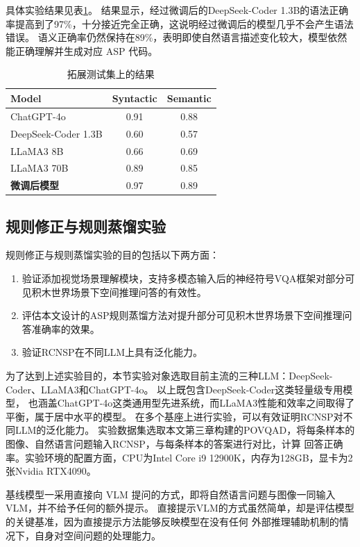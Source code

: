 具体实验结果见表\ref{tab:robust1}。
结果显示，经过微调后的DeepSeek-Coder 1.3B的语法正确率提高到了97\%，十分接近完全正确，这说明经过微调后的模型几乎不会产生语法错误。
语义正确率仍然保持在89\%，表明即使自然语言描述变化较大，模型依然能正确理解并生成对应 ASP 代码。

\begin{table}[h]
\centering
\begin{tabular}{lcc}
\toprule
\textbf{Model} & \textbf{Syntactic} & \textbf{Semantic} \\
\midrule
ChatGPT-4o     & 0.91   & 0.88 \\
DeepSeek-Coder 1.3B         & 0.60     & 0.57 \\
LLaMA3 8B      & 0.66     & 0.69 \\
LLaMA3 70B    & 0.89     & 0.85 \\
\midrule
\textbf{微调后模型}  & 0.97 & 0.89 \\
\bottomrule
\end{tabular}
\caption{拓展测试集上的结果}
\label{tab:robust1}
\end{table}
\subsection{规则修正与规则蒸馏实验}
规则修正与规则蒸馏实验的目的包括以下两方面：
\begin{enumerate}[nosep]
\item 验证添加视觉场景理解模块，支持多模态输入后的神经符号VQA框架对部分可见积木世界场景下空间推理问答的有效性。
\item 评估本文设计的ASP规则蒸馏方法对提升部分可见积木世界场景下空间推理问答准确率的效果。
\item 验证RCNSP在不同LLM上具有泛化能力。
\end{enumerate}

为了达到上述实验目的，本节实验对象选取目前主流的三种LLM：DeepSeek-Coder、LLaMA3和ChatGPT-4o。
以上既包含DeepSeek-Coder这类轻量级专用模型，
也涵盖ChatGPT-4o这类通用型先进系统，而LLaMA3性能和效率之间取得了平衡，属于居中水平的模型。
在多个基座上进行实验，可以有效证明RCNSP对不同LLM的泛化能力。
实验数据集选取本文第三章构建的POVQAD，将每条样本的图像、自然语言问题输入RCNSP，与每条样本的答案进行对比，计算
回答正确率。实验环境的配置方面，CPU为Intel Core i9 12900K，内存为128GB，显卡为2张Nvidia RTX4090。

基线模型一采用直接向 VLM 提问的方式，即将自然语言问题与图像一同输入 VLM，并不给予任何的额外提示。
直接提示VLM的方式虽然简单，却是评估模型的关键基准，因为直接提示方法能够反映模型在没有任何
外部推理辅助机制的情况下，自身对空间问题的处理能力。

